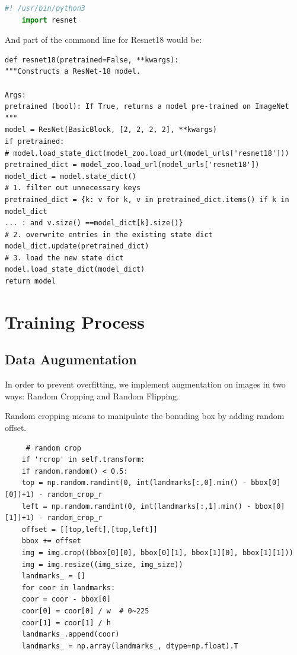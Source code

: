 \documentclass{article}
\begin{document}
\begin{file}
	\begin{lstlisting}[language=Python]
	#! /usr/bin/python3
	import resnet
	\end{lstlisting}
\end{file}

And part of the commond line for Resnet18 would be:
\begin{commandline}
	\begin{verbatim}
def resnet18(pretrained=False, **kwargs):
"""Constructs a ResNet-18 model.

Args:
pretrained (bool): If True, returns a model pre-trained on ImageNet
"""
model = ResNet(BasicBlock, [2, 2, 2, 2], **kwargs)
if pretrained:
# model.load_state_dict(model_zoo.load_url(model_urls['resnet18']))
pretrained_dict = model_zoo.load_url(model_urls['resnet18'])
model_dict = model.state_dict()
# 1. filter out unnecessary keys
pretrained_dict = {k: v for k, v in pretrained_dict.items() if k in model_dict 
... : and v.size() ==model_dict[k].size()}
# 2. overwrite entries in the existing state dict
model_dict.update(pretrained_dict) 
# 3. load the new state dict
model.load_state_dict(model_dict)
return model
	\end{verbatim}
\end{commandline}

\section{Training Process}
\subsection{Data Augumentation}
In order to prevent overfitting, we implement augmentation on images in two ways: Random Cropping and Random Flipping.

Random cropping means to manipulate the bonuding box by adding random offset.

\begin{commandline}
	\begin{verbatim}
	 # random crop
	if 'rcrop' in self.transform:
	if random.random() < 0.5:
	top = np.random.randint(0, int(landmarks[:,0].min() - bbox[0][0])+1) - random_crop_r
	left = np.random.randint(0, int(landmarks[:,1].min() - bbox[0][1])+1) - random_crop_r
	offset = [[top,left],[top,left]]
	bbox += offset
	img = img.crop((bbox[0][0], bbox[0][1], bbox[1][0], bbox[1][1]))
	img = img.resize((img_size, img_size))
	landmarks_ = []
	for coor in landmarks:
	coor = coor - bbox[0]
	coor[0] = coor[0] / w  # 0~225
	coor[1] = coor[1] / h 
	landmarks_.append(coor)
	landmarks_ = np.array(landmarks_, dtype=np.float).T
	

	\end{verbatim}
\end{commandline}
\end{document}

